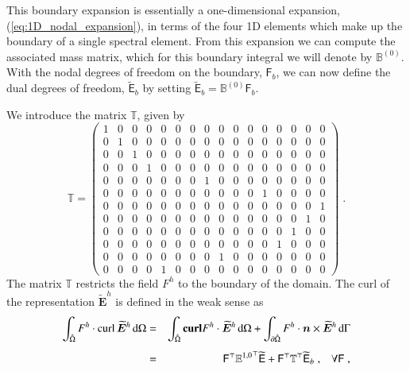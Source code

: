 \documentclass[graybox]{svmult}
\begin{document}
This boundary expansion is essentially a one-dimensional expansion, (\ref{eq:1D_nodal_expansion}), in terms of the four 1D elements which make up the boundary of a single spectral element. From this expansion we can compute the associated mass matrix, which for this boundary integral we will denote by $\mathbb{B}^{(0)}$. With the nodal degrees of freedom on the boundary, $\mathsf{F}_b$, we can now define the dual degrees of freedom, $\widetilde{\mathsf{E}}_b$ by setting $\widetilde{\mathsf{E}}_b = \mathbb{B}^{(0)} \mathsf{F}_b$.

We introduce the matrix $\mathbb{T}$, given by
\begin{equation}
\mathbb{T} = \left ( \begin{array}{cccccccccccccccc}
1 & 0 & 0 & 0 & 0 & 0 & 0 & 0 & 0 & 0 & 0 & 0 & 0 & 0 & 0 & 0 \\
0 & 1 & 0 & 0 & 0 & 0 & 0 & 0 & 0 & 0 & 0 & 0 & 0 & 0 & 0 & 0 \\
0 & 0 & 1 & 0 & 0 & 0 & 0 & 0 & 0 & 0 & 0 & 0 & 0 & 0 & 0 & 0 \\
0 & 0 & 0 & 1 & 0 & 0 & 0 & 0 & 0 & 0 & 0 & 0 & 0 & 0 & 0 & 0 \\
0 & 0 & 0 & 0 & 0 & 0 & 0 & 1 & 0 & 0 & 0 & 0 & 0 & 0 & 0 & 0 \\
0 & 0 & 0 & 0 & 0 & 0 & 0 & 0 & 0 & 0 & 0 & 1 & 0 & 0 & 0 & 0 \\
0 & 0 & 0 & 0 & 0 & 0 & 0 & 0 & 0 & 0 & 0 & 0 & 0 & 0 & 0 & 1 \\
0 & 0 & 0 & 0 & 0 & 0 & 0 & 0 & 0 & 0 & 0 & 0 & 0 & 0 & 1 & 0 \\
0 & 0 & 0 & 0 & 0 & 0 & 0 & 0 & 0 & 0 & 0 & 0 & 0 & 1 & 0 & 0 \\
0 & 0 & 0 & 0 & 0 & 0 & 0 & 0 & 0 & 0 & 0 & 0 & 1 & 0 & 0 & 0 \\
0 & 0 & 0 & 0 & 0 & 0 & 0 & 0 & 1 & 0 & 0 & 0 & 0 & 0 & 0 & 0 \\
0 & 0 & 0 & 0 & 1 & 0 & 0 & 0 & 0 & 0 & 0 & 0 & 0 & 0 & 0 & 0
\end{array} \right ) \;.
\end{equation}
The matrix $\mathbb{T}$ restricts the field $F^h$ to the boundary of the domain.
The curl of the representation $\widetilde{\bm{E}}^h$ is defined in the weak sense as
\begin{eqnarray}
\int_{\hat{\Omega}} F^h \cdot \mbox{curl}\,\widetilde{\bm{E}}^h\,\mathrm{d} \Omega & = & \int_{\hat{\Omega}} \mbox{\bf{curl}} F^h \cdot \widetilde{\bm{E}}^h \,\mathrm{d} \Omega + \int_{\partial \hat{\Omega}}  F^h \cdot \bm{n} \times \widetilde{\bm{E}}^h \,\mathrm{d} \Gamma \nonumber \\[1ex]
 & = & \mathsf{F}^{\top} {\mathbb{E}^{1,0}}^{\top} \widetilde{\mathsf{E}} + {\mathsf{F}}^{\top} \mathbb{T}^{\top} \widetilde{\mathsf{E}}_b  \;,\;\;\; \forall \mathsf{F} \;,\label{eq:dirivative_dual_E}
\end{eqnarray}
\end{document}
